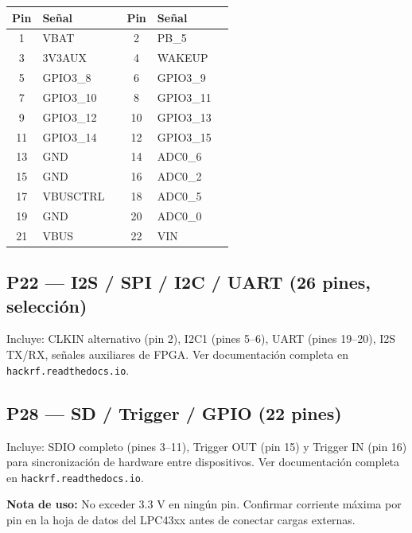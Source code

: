 \documentclass[11pt]{article}
\begin{document}
\begin{table}[h]
    \centering
    \small
    \begin{tabular}{clc|clc}
        \toprule
        \textbf{Pin} & \textbf{Señal} & & \textbf{Pin} & \textbf{Señal} & \\
        \midrule
        1  & VBAT       & & 2  & PB\_5        & \\
        3  & 3V3AUX     & & 4  & WAKEUP       & \\
        5  & GPIO3\_8   & & 6  & GPIO3\_9     & \\
        7  & GPIO3\_10  & & 8  & GPIO3\_11    & \\
        9  & GPIO3\_12  & & 10 & GPIO3\_13    & \\
        11 & GPIO3\_14  & & 12 & GPIO3\_15    & \\
        13 & GND        & & 14 & ADC0\_6      & \\
        15 & GND        & & 16 & ADC0\_2      & \\
        17 & VBUSCTRL   & & 18 & ADC0\_5      & \\
        19 & GND        & & 20 & ADC0\_0      & \\
        21 & VBUS       & & 22 & VIN          & \\
        \bottomrule
    \end{tabular}
\end{table}

\subsection*{P22 — I2S / SPI / I2C / UART (26 pines, selección)}

Incluye: CLKIN alternativo (pin 2), I2C1 (pines 5--6), UART (pines 19--20), I2S TX/RX, señales auxiliares de FPGA. Ver documentación completa en \texttt{hackrf.readthedocs.io}.

\subsection*{P28 — SD / Trigger / GPIO (22 pines)}

Incluye: SDIO completo (pines 3--11), Trigger OUT (pin 15) y Trigger IN (pin 16) para sincronización de hardware entre dispositivos. Ver documentación completa en \texttt{hackrf.readthedocs.io}.

\textbf{Nota de uso:} No exceder 3.3 V en ningún pin. Confirmar corriente máxima por pin en la hoja de datos del LPC43xx antes de conectar cargas externas.
\end{document}
